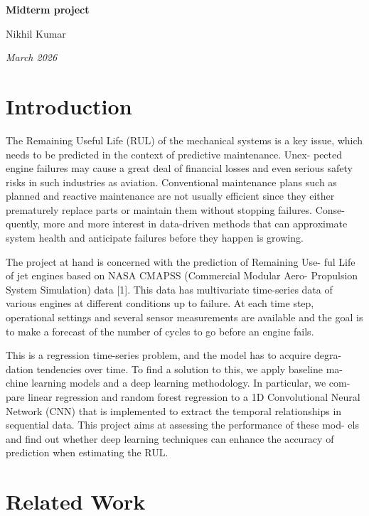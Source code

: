 \documentclass[11pt]{article}
\begin{document}
\begin{center}
{\Large \textbf{Midterm project}}

\vspace{10pt}

Nikhil Kumar

\vspace{10pt}

\textit{March 2026}
\end{center}

\section{Introduction}

The Remaining Useful Life (RUL) of the mechanical systems is a key issue,
which needs to be predicted in the context of predictive maintenance. Unex-
pected engine failures may cause a great deal of financial losses and even serious
safety risks in such industries as aviation. Conventional maintenance plans such
as planned and reactive maintenance are not usually efficient since they either
prematurely replace parts or maintain them without stopping failures. Conse-
quently, more and more interest in data-driven methods that can approximate
system health and anticipate failures before they happen is growing.

The project at hand is concerned with the prediction of Remaining Use-
ful Life of jet engines based on NASA CMAPSS (Commercial Modular Aero-
Propulsion System Simulation) data [1]. This data has multivariate time-series
data of various engines at different conditions up to failure. At each time step,
operational settings and several sensor measurements are available and the goal
is to make a forecast of the number of cycles to go before an engine fails.

This is a regression time-series problem, and the model has to acquire degra-
dation tendencies over time. To find a solution to this, we apply baseline ma-
chine learning models and a deep learning methodology. In particular, we com-
pare linear regression and random forest regression to a 1D Convolutional Neural
Network (CNN) that is implemented to extract the temporal relationships in
sequential data. This project aims at assessing the performance of these mod-
els and find out whether deep learning techniques can enhance the accuracy of
prediction when estimating the RUL.

\section{Related Work}
\end{document}

